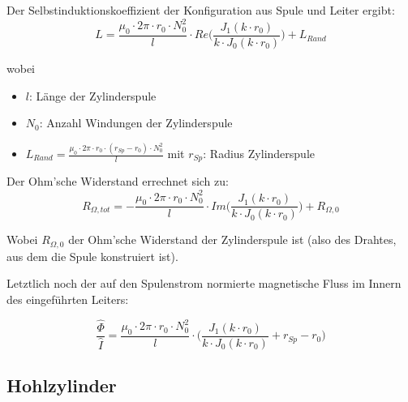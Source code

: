 Der Selbstinduktionskoeffizient der Konfiguration aus Spule und Leiter ergibt:
\begin{equation}
    \label{eq:vollzylinder:LExact}
    L = \frac{\mu_0 \cdot 2\pi \cdot r_0 \cdot N_0^2}{l} \cdot Re \Biggl(\frac{J_1 (k \cdot r_0)}{k \cdot J_0 (k \cdot r_0)} \Biggr) + L_{Rand}
\end{equation}

wobei
\begin{itemize}
    \item[]
        $l$: L\"ange der Zylinderspule
    \item[]
        $N_0$: Anzahl Windungen der Zylinderspule
    \item[]
        $L_{Rand} = \frac{\mu_0 \cdot 2\pi \cdot r_0 \cdot (r_{Sp} - r_0) \cdot N_0^2}{l}$ mit $r_{Sp}$: Radius Zylinderspule
\end{itemize}

Der Ohm'sche Widerstand errechnet sich zu:
\begin{equation}
    \label{eq:vollzylinder:RExact}
    R_{\Omega,tot} = - \frac{\mu_0 \cdot 2\pi \cdot r_0 \cdot N_0^2}{l} \cdot Im \Biggl(\frac{J_1 (k \cdot r_0)}{k \cdot J_0 (k \cdot r_0)} \Biggr) + R_{\Omega,0}
\end{equation}

Wobei $R_{\Omega,0}$ der  Ohm'sche Widerstand der Zylinderspule  ist (also des
Drahtes, aus dem die Spule konstruiert ist).

Letztlich noch der auf den Spulenstrom normierte magnetische Fluss im Innern
des eingef\"uhrten Leiters:

\begin{equation}
    \label{eq:vollzylinder:phiExact}
    \frac{\hat{\Phi}}{\hat{I}} = \frac{\mu_0 \cdot 2\pi \cdot r_0 \cdot N_0^2}{l} \cdot \Biggl(\frac{J_1 (k \cdot r_0)}{k \cdot J_0 (k \cdot r_0)} + r_{Sp} - r_0 \Biggr)
\end{equation}


\subsection{Hohlzylinder}
\label{sec:arbgru:subsec:hohlzyliner}


